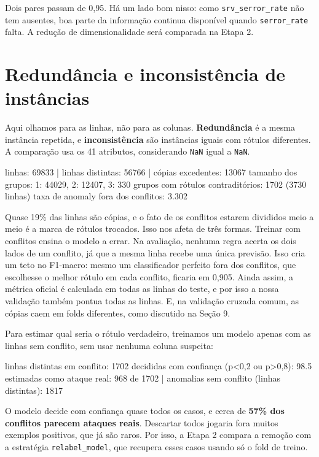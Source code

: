 \documentclass[11pt,a4paper]{article}
\begin{document}
Dois pares passam de 0,95. Há um lado bom nisso: como \texttt{srv\_serror\_rate} não tem ausentes, boa parte da informação continua disponível quando \texttt{serror\_rate} falta. A redução de dimensionalidade será comparada na Etapa 2.

\section{Redundância e inconsistência de instâncias}

Aqui olhamos para as linhas, não para as colunas. \textbf{Redundância} é a mesma instância repetida, e \textbf{inconsistência} são instâncias iguais com rótulos diferentes. A comparação usa os 41 atributos, considerando \texttt{NaN} igual a \texttt{NaN}.

\begin{saida}
linhas: 69833  |  linhas distintas: 56766  |  cópias excedentes: 13067
tamanho dos grupos: {1: 44029, 2: 12407, 3: 330}
grupos com rótulos contraditórios: 1702 (3730 linhas)
taxa de anomaly fora dos conflitos: 3.302%
\end{saida}

Quase 19\% das linhas são cópias, e o fato de os conflitos estarem divididos meio a meio é a marca de rótulos trocados. Isso nos afeta de três formas. Treinar com conflitos ensina o modelo a errar. Na avaliação, nenhuma regra acerta os dois lados de um conflito, já que a mesma linha recebe uma única previsão. Isso cria um teto no F1-macro: mesmo um classificador perfeito fora dos conflitos, que escolhesse o melhor rótulo em cada conflito, ficaria em 0,905. Ainda assim, a métrica oficial é calculada em todas as linhas do teste, e por isso a nossa validação também pontua todas as linhas. E, na validação cruzada comum, as cópias caem em folds diferentes, como discutido na Seção 9.

Para estimar qual seria o rótulo verdadeiro, treinamos um modelo apenas com as linhas sem conflito, sem usar nenhuma coluna suspeita:

\begin{saida}
linhas distintas em conflito: 1702
decididas com confiança (p<0,2 ou p>0,8): 98.5%
estimadas como ataque real: 968 de 1702  |  anomalias sem conflito (linhas distintas): 1817
\end{saida}

O modelo decide com confiança quase todos os casos, e cerca de \textbf{57\% dos conflitos parecem ataques reais}. Descartar todos jogaria fora muitos exemplos positivos, que já são raros. Por isso, a Etapa 2 compara a remoção com a estratégia \texttt{relabel\_model}, que recupera esses casos usando só o fold de treino.
\end{document}
